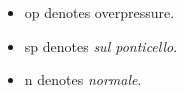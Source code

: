 \begin{itemize}
    \item op denotes overpressure.
    \item sp denotes \emph{sul ponticello}.
    \item n denotes \emph{normale}.
\end{itemize}

\newpage\label{app:bassPiece Score}

% 

